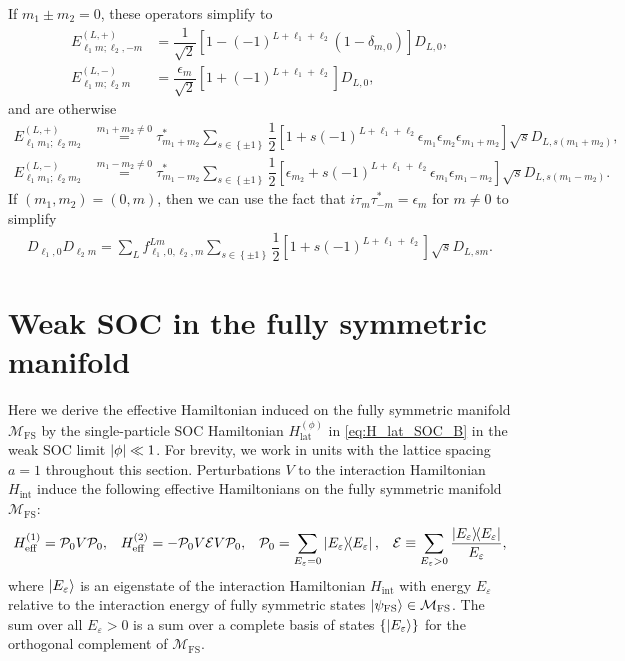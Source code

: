 \documentclass[nofootinbib,notitlepage,11pt]{revtex4-2}
\renewcommand{\t}{\text} %
\newcommand{\f}[2]{\dfrac{#1}{#2}} %
\newcommand{\p}[1]{\left(#1\right)} %
\renewcommand{\sp}[1]{\left[#1\right]} %
\renewcommand{\set}[1]{\left\{#1\right\}} %
\newcommand{\1}{\mathds{1}}
\newcommand{\E}{\mathcal{E}}
\newcommand{\M}{\mathcal{M}}
\renewcommand{\P}{\mathcal{P}}
\newcommand{\FS}{\text{FS}}
\begin{document}
If $m_1\pm m_2=0$, these operators simplify to
\begin{align}
  E_{\ell_1 m;\ell_2,-m}^{(L,+)}
  &= \f1{\sqrt{2}} \sp{1 - \p{-1}^{L+\ell_1+\ell_2}
    \p{1-\delta_{m,0}}} D_{L,0}, \\
  E_{\ell_1 m;\ell_2 m}^{(L,-)}
  &= \f{\epsilon_m}{\sqrt{2}}
  \sp{1 + \p{-1}^{L+\ell_1+\ell_2}} D_{L,0},
\end{align}
and are otherwise
\begin{align}
  E_{\ell_1 m_1;\ell_2 m_2}^{(L,+)}
  &\stackrel{m_1+m_2\ne0}{=}
  \tau_{m_1+m_2}^* \sum_{s\in\set{\pm1}}
  \f12 \sp{1 + s \p{-1}^{L+\ell_1+\ell_2}
    \epsilon_{m_1} \epsilon_{m_2} \epsilon_{m_1+m_2}}
  \sqrt{s} D_{L,s\p{m_1+m_2}}, \\
  E_{\ell_1 m_1;\ell_2 m_2}^{(L,-)}
  &\stackrel{m_1-m_2\ne0}{=}
  \tau_{m_1-m_2}^* \sum_{s\in\set{\pm1}}
  \f12 \sp{\epsilon_{m_2} + s \p{-1}^{L+\ell_1+\ell_2}
    \epsilon_{m_1} \epsilon_{m_1-m_2}}
  \sqrt{s} D_{L,s\p{m_1-m_2}}.
\end{align}
If $\p{m_1,m_2}=\p{0,m}$, then we can use the fact that
$i\tau_m\tau_{-m}^*=\epsilon_m$ for $m\ne0$ to simplify
\begin{align}
  D_{\ell_1,0} D_{\ell_2 m}
  = \sum_L f_{\ell_1,0,\ell_2,m}^{Lm}
  \sum_{s\in\set{\pm1}} \f12 \sp{1 + s \p{-1}^{L+\ell_1+\ell_2}}
  \sqrt{s} D_{L,sm}.
\end{align}

\section{Weak SOC in the fully symmetric manifold}
\label{sec:SOC_pert}

Here we derive the effective Hamiltonian induced on the fully
symmetric manifold $\M_\FS$ by the single-particle SOC Hamiltonian
$H_{\t{lat}}^{(\phi)}$ in \eqref{eq:H_lat_SOC_B} in the weak SOC limit
$\abs{\phi}\ll1$.  For brevity, we work in units with the lattice
spacing $a=1$ throughout this section.  Perturbations $V$ to the
interaction Hamiltonian $H_{\t{int}}$ induce the following effective
Hamiltonians on the fully symmetric manifold
$\M_\FS$\cite{bravyi2011schrieffer, perlin2019effective}:
\begin{align}
  H_{\t{eff}}^{(1)} = \P_0 V \P_0,
  &&
  H_{\t{eff}}^{(2)} = -\P_0 V \E V \P_0,
  &&
  \P_0 = \sum_{E_{\varepsilon}=0} \op{E_{\varepsilon}},
  &&
  \E \equiv \sum_{E_\varepsilon>0} \f{\op{E_\varepsilon}}{E_\varepsilon},
  \label{eq:pert}
\end{align}
where $\ket{E_\varepsilon}$ is an eigenstate of the interaction
Hamiltonian $H_{\t{int}}$ with energy $E_\varepsilon$ relative to the
interaction energy of fully symmetric states
$\ket{\psi_\FS}\in\M_\FS$.  The sum over all $E_\varepsilon>0$ is a
sum over a complete basis of states $\set{\ket{E_\varepsilon}}$ for
the orthogonal complement of $\M_\FS$.
\end{document}
